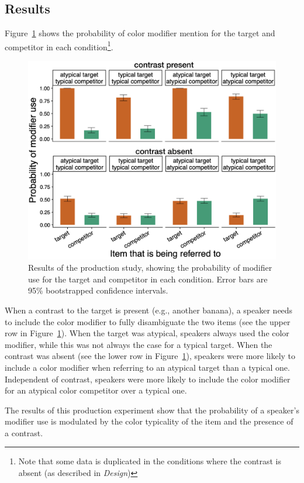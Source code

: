 \documentclass[10pt,letterpaper]{article}
\newcommand{\ek}[1]{\textcolor{Orange}{[ek: #1]}}
\begin{document}
\subsection{Results}
Figure~\ref{prod-results} shows the probability of color modifier mention for the target and competitor in each condition\footnote{Note that some data is duplicated in the conditions where the contrast is absent (as described in \textit{Design})}. 

\begin{figure}
	\begin{center}
		\includegraphics[width=.475\textwidth]{graphs/prod-bycond-paper.pdf}
	\end{center}
\caption{Results of the production study, showing the probability of modifier use for the target and competitor in each condition. Error bars are 95\% bootstrapped confidence intervals.} 
\label{prod-results}
\end{figure}

When a contrast to the target is present (e.g., another banana), a speaker needs to include the color modifier to fully disambiguate the two items (see the upper row in Figure~\ref{prod-results}). When the target was atypical, speakers always used the color modifier, while this was not always the case for a typical target. When the contrast was absent (see the lower row in Figure~\ref{prod-results}), speakers were more likely to include a color modifier when referring to an atypical target than a typical one. Independent of contrast, speakers were more likely to include the color modifier for an atypical color competitor over a typical one.

The results of this production experiment show that the probability of a speaker's modifier use is modulated by the color typicality of the item and the presence of a contrast. 
\end{document}
